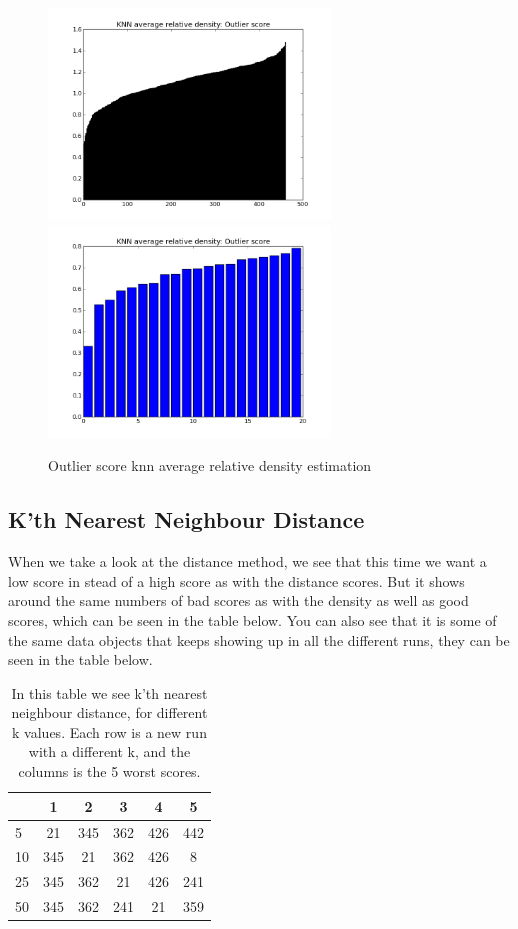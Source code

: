 \begin{figure}[H]
\centering
\includegraphics[width=7.5cm, keepaspectratio=true]{pictures/knnAvgdensityEstimationAll.png}
\includegraphics[width=7.5cm, keepaspectratio=true]{pictures/knnAvgdensityEstimation20.png}
\vspace{-0.4cm}
\caption{\footnotesize Outlier score knn average relative density estimation}
\label{avg}
\end{figure}

\subsection{K'th Nearest Neighbour Distance}

When we take a look at the distance method, we see that this time we want a low score in stead of a high score as with the distance scores. But it shows around the same numbers of bad scores as with the density as well as good scores, which can be seen in the table below. You can also see that it is some of the same data objects that keeps showing up in all the different runs, they can be seen in the table below.
\begin{table}[H]
\begin{longtable}{lccccc}
\hline
   & 1   & 2   & 3   & 4   & 5   \\ \hline
5  & 21  & 345 & 362 & 426 & 442 \\ 
10 & 345 & 21  & 362 & 426 & 8   \\ 
25 & 345 & 362 & 21  & 426 & 241 \\
50 & 345 & 362 & 241 & 21  & 359 \\ \hline
\end{longtable}
\caption{\footnotesize In this table we see k'th nearest neighbour distance, for different k values. Each row is a new run with a different k, and the columns is the 5 worst scores.}
\end{table}

